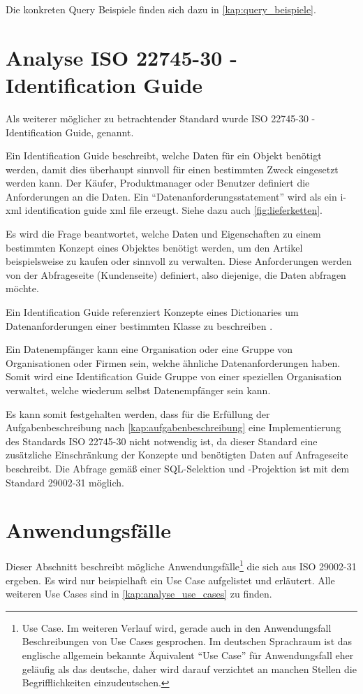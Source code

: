 Die konkreten Query Beispiele finden sich dazu in \autoref{kap:query_beispiele}.

\section{Analyse ISO 22745-30 - Identification Guide}\label{kap:identification_guide}

Als weiterer möglicher zu betrachtender Standard wurde ISO 22745-30 - Identification Guide, genannt. 

Ein Identification Guide beschreibt, welche Daten für ein Objekt benötigt werden, damit dies überhaupt sinnvoll für einen bestimmten Zweck eingesetzt werden kann. Der Käufer, Produktmanager oder Benutzer definiert die Anforderungen an die Daten. Ein  \enquote{Datenanforderungsstatement} wird als ein i-xml identification guide xml file erzeugt. Siehe dazu auch \autoref{fig:lieferketten}. 

Es wird die Frage beantwortet, welche Daten und Eigenschaften zu einem bestimmten Konzept eines Objektes benötigt werden, um den Artikel beispielsweise zu kaufen oder sinnvoll zu verwalten. Diese Anforderungen werden von der Abfrageseite (Kundenseite) definiert, also diejenige, die Daten abfragen möchte\citep[Vergl.][]{bensonQuality}. 

Ein Identification Guide referenziert Konzepte eines Dictionaries um Datenanforderungen einer bestimmten Klasse zu beschreiben \citep[Vergl.][Kap. 5]{iso22745-30}.

Ein Datenempfänger kann eine Organisation oder eine Gruppe von Organisationen oder Firmen sein, welche ähnliche Datenanforderungen haben. Somit wird eine Identification Guide Gruppe von einer speziellen Organisation verwaltet, welche wiederum selbst Datenempfänger sein kann.  

Es kann somit festgehalten werden, dass für die Erfüllung der Aufgabenbeschreibung nach \autoref{kap:aufgabenbeschreibung} eine Implementierung des Standards ISO 22745-30 nicht notwendig ist, da dieser Standard eine zusätzliche Einschränkung der Konzepte und benötigten Daten auf Anfrageseite beschreibt. 
Die Abfrage gemäß einer SQL-Selektion und -Projektion ist mit dem Standard 29002-31 möglich. 

\section{Anwendungsfälle}\label{kap:Use_Cases}

Dieser Abschnitt beschreibt mögliche Anwendungsfälle\footnote{Use Case. Im weiteren Verlauf wird, gerade auch in den Anwendungsfall Beschreibungen von Use Cases gesprochen. Im deutschen Sprachraum ist das englische allgemein bekannte Äquivalent \enquote{Use Case} für Anwendungsfall eher geläufig als das deutsche, daher wird darauf verzichtet an manchen Stellen die Begrifflichkeiten einzudeutschen.} die sich aus ISO 29002-31 ergeben. 
Es wird nur beispielhaft ein Use Case aufgelistet und erläutert. Alle weiteren Use Cases sind in \autoref{kap:analyse_use_cases} zu finden. 

